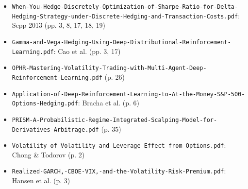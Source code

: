 \documentclass{article}
\begin{document}
\begin{itemize}

\item \texttt{When-\allowbreak{}You-\allowbreak{}Hedge-\allowbreak{}Discretely-\allowbreak{}Optimization-\allowbreak{}of-\allowbreak{}Sharpe-\allowbreak{}Ratio-\allowbreak{}for-\allowbreak{}Delta-\allowbreak{}Hedging-\allowbreak{}Strategy-\allowbreak{}under-\allowbreak{}Discrete-\allowbreak{}Hedging-\allowbreak{}and-\allowbreak{}Transaction-\allowbreak{}Costs.\allowbreak{}pdf}: Sepp 2013 (pp. 3, 8, 17, 18, 19)

\item \texttt{Gamma-\allowbreak{}and-\allowbreak{}Vega-\allowbreak{}Hedging-\allowbreak{}Using-\allowbreak{}Deep-\allowbreak{}Distributional-\allowbreak{}Reinforcement-\allowbreak{}Learning.\allowbreak{}pdf}: Cao et al. (pp. 3, 17)

\item \texttt{OPHR-\allowbreak{}Mastering-\allowbreak{}Volatility-\allowbreak{}Trading-\allowbreak{}with-\allowbreak{}Multi-\allowbreak{}Agent-\allowbreak{}Deep-\allowbreak{}Reinforcement-\allowbreak{}Learning.\allowbreak{}pdf} (p. 26)

\item \texttt{Application-\allowbreak{}of-\allowbreak{}Deep-\allowbreak{}Reinforcement-\allowbreak{}Learning-\allowbreak{}to-\allowbreak{}At-\allowbreak{}the-\allowbreak{}Money-\allowbreak{}S\&P-\allowbreak{}500-\allowbreak{}Options-\allowbreak{}Hedging.\allowbreak{}pdf}: Bracha et al. (p. 6)

\item \texttt{PRISM-\allowbreak{}A-\allowbreak{}Probabilistic-\allowbreak{}Regime-\allowbreak{}Integrated-\allowbreak{}Scalping-\allowbreak{}Model-\allowbreak{}for-\allowbreak{}Derivatives-\allowbreak{}Arbitrage.\allowbreak{}pdf} (p. 35)

\item \texttt{Volatility-\allowbreak{}of-\allowbreak{}Volatility-\allowbreak{}and-\allowbreak{}Leverage-\allowbreak{}Effect-\allowbreak{}from-\allowbreak{}Options.\allowbreak{}pdf}: Chong \& Todorov (p. 2)

\item \texttt{Realized-\allowbreak{}GARCH,\allowbreak{}-\allowbreak{}CBOE-\allowbreak{}VIX,\allowbreak{}-\allowbreak{}and-\allowbreak{}the-\allowbreak{}Volatility-\allowbreak{}Risk-\allowbreak{}Premium.\allowbreak{}pdf}: Hansen et al. (p. 3)

\end{itemize}
\end{document}
